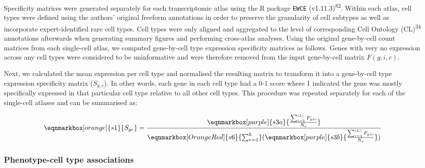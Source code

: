\documentclass[
]{article}
\begin{document}
Specificity matrices were generated separately for each transcriptomic
atlas using the R package \texttt{EWCE} (v1.11.3)\textsuperscript{82}.
Within each atlas, cell types were defined using the authors' original
freeform annotations in order to preserve the granularity of cell
subtypes as well as incorporate expert-identified rare cell types. Cell
types were only aligned and aggregated to the level of corresponding
Cell Ontology (CL)\textsuperscript{34} annotations afterwards when
generating summary figures and performing cross-atlas analyses. Using
the original gene-by-cell count matrices from each single-cell atlas, we
computed gene-by-cell type expression specificity matrices as follows.
Genes with very no expression across any cell types were considered to
be uninformative and were therefore removed from the input gene-by-cell
matrix \(F(g,i,c)\).

Next, we calculated the mean expression per cell type and normalised the
resulting matrix to transform it into a gene-by-cell type expression
specificity matrix (\(S_{g,c}\)). In other words, each gene in each cell
type had a 0-1 score where 1 indicated the gene was mostly specifically
expressed in that particular cell type relative to all other cell types.
This procedure was repeated separately for each of the single-cell
atlases and can be summarised as:

\hfill\break

\begin{equation*}
  \eqnmarkbox[orange]{s1}{S_{gc}}
  =
  \frac{
    \eqnmarkbox[purple]{s3a}{
      \frac{
        \sum_{i=1}^{|L|} F_{gic}
      }{
        N_c  
      }
    } 
  }{
   \eqnmarkbox[OrangeRed]{s6}{\sum_{r=1}^{k}}(
     \eqnmarkbox[purple]{s3b}{
      \frac{
        \sum_{i=1}^{|L|} F_{gic}
      }{
        N_c  
      }
    } 
   ) 
  }
\end{equation*}

\hfill\break

\subsubsection{Phenotype-cell type
associations}\label{phenotype-cell-type-associations-1}
\end{document}
